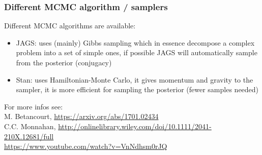 \documentclass{beamer}
\begin{document}
\begin{frame}
\begin{columns}
   
     
   
  \end{columns}

  
  
  
  
  
 \end{frame}



  \begin{frame}
  \frametitle{\bf Different MCMC algorithm / samplers}
  
  Different MCMC algorithms are available:
  
  \begin{itemize}
   \item JAGS: uses (mainly) Gibbs sampling which in essence decompose a complex problem into a set of simple ones, if possible JAGS will automatically sample from the posterior (conjugacy)
   \item Stan: uses Hamiltonian-Monte Carlo, it gives momentum and gravity to the sampler, it is more efficient for sampling the posterior (fewer samples needed)
  \end{itemize}
  
  For more infos see:\\
  M. Betancourt, \url{https://arxiv.org/abs/1701.02434}\\
  C.C. Monnahan, \url{http://onlinelibrary.wiley.com/doi/10.1111/2041-210X.12681/full}\\
  \url{https://www.youtube.com/watch?v=VnNdhsm0rJQ}
  
 \end{frame}
 
\end{document}
